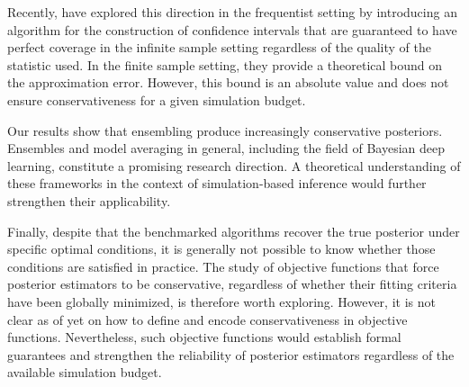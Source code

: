 \documentclass[twoside]{article}
\begin{document}
Recently, \citet{dalmasso2021likelihood} have explored this direction in the frequentist setting by introducing an algorithm for the construction of confidence intervals that are guaranteed to have perfect coverage in the infinite sample setting regardless of the quality of the statistic used. In the finite sample setting, they provide a theoretical bound on the approximation error. 
However, this bound is an absolute value and does not ensure conservativeness for a given simulation budget. 

Our results show that ensembling produce increasingly conservative posteriors. Ensembles and model averaging in general, including the field of Bayesian deep learning, constitute a promising research direction. A theoretical understanding of these frameworks in the context of simulation-based inference would further strengthen their applicability.

Finally, despite that the benchmarked algorithms recover the true posterior under specific optimal conditions, it is generally not possible to know whether those conditions are satisfied in practice.
The study of objective functions that force posterior estimators to be conservative, regardless of whether their fitting criteria have been globally minimized, is therefore worth exploring. However, it is not clear as of yet on how to define and encode conservativeness in objective functions. Nevertheless, such objective functions would establish formal guarantees and strengthen the reliability of posterior estimators regardless of the available simulation budget.
\end{document}
